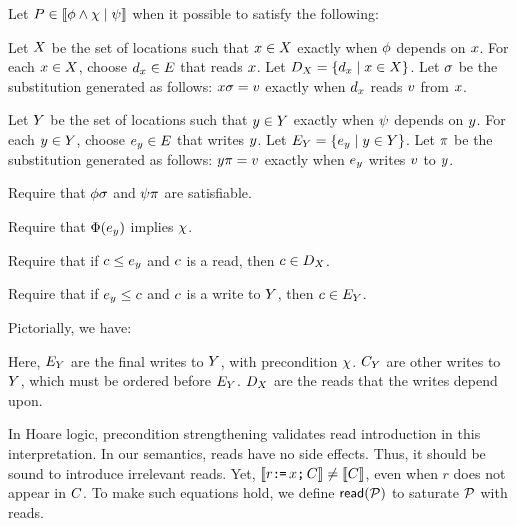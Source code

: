 \begin{definition}
  Let $P\in\llbracket\phi\land\chi\mid\psi\rrbracket$
  when it possible to satisfy the following:

  Let $X$ be the set of locations such that $x\in X$ exactly
  when $\phi$ depends on $x$.  For each $x\in X$, choose
  $d_x\in E$ that reads $x$.
  Let $D_X=\{d_x\mid x\in X\}$.
  Let $\sigma$ be the substitution generated %
  as follows:
  $x\sigma = v$ exactly when $d_x$ reads $v$ from $x$.

  Let $Y$ be the set of locations such that $y\in Y$ exactly
  when $\psi$ depends on $y$.  For each $y\in Y$, choose
  $e_y\in E$ that writes $y$.
  Let $E_Y=\{e_y\mid y\in Y\}$.
  Let $\pi$ be the substitution generated %
  as follows:
  $y\pi = v$ exactly when $e_y$ writes $v$ to $y$.

  Require that $\phi\sigma$ and $\psi\pi$ are satisfiable.

  Require that $\Phi(e_y)$ implies $\chi$.
  
  Require that if $c\le e_y$ and $c$ is a read, then $c\in D_X$.

  Require that if $e_y\le c$ and $c$ is a write to $Y$, then $c\in E_Y$.
\end{definition}
Pictorially, we have:
\begin{tikzdisplay}[node distance=.1ex and 2em]
\end{tikzdisplay}
Here, $E_Y$ are the final writes to $Y$, with precondition $\chi$.
$C_Y$ are other writes to $Y$, which must be ordered before $E_Y$.
$D_X$ are the reads that the writes depend upon.

In Hoare logic, precondition strengthening validates read introduction in
this interpretation.  In our semantics, reads have no side effects.  Thus, it
should be sound to introduce irrelevant reads.  Yet,
$\llbracket r\texttt{:}\mkern-1mu\texttt{=}\, x\texttt{;}\,\allowbreak C\rrbracket\neq \llbracket C\rrbracket$, even when $r$ does not appear in
$C$.  To make such equations hold, we define ${\mathsf{read}}(\mathcal{P})$ to saturate
$\mathcal{P}$ with reads.


